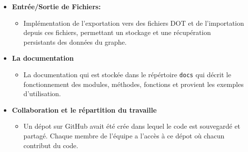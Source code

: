 \documentclass{article}
\begin{document}
\begin{itemize}
\begin{itemize}
    \end{itemize}
    \item \textbf{Entrée/Sortie de Fichiers:}
    \begin{itemize}
        \item Implémentation de l'exportation vers des fichiers DOT et de l'importation depuis ces fichiers, permettant un stockage et une récupération persistants des données du graphe.
    \end{itemize}
    \item \textbf{La documentation}
    \begin{itemize}
        \item La documentation qui est stockée dans le répértoire \texttt{docs} qui décrit le fonctionnement des modules, méthodes, fonctions et provient les exemples d'utilisation.
    \end{itemize}
    \item \textbf{Collaboration et le répartition du travaille}
    \begin{itemize}
        \item Un dépot sur GitHub avait été crée dans lequel le code est souvegardé et partagé. Chaque membre de l'équipe a l'accès à ce dépot où chacun contribut du code.
    \end{itemize}
\end{itemize}
\end{document}
